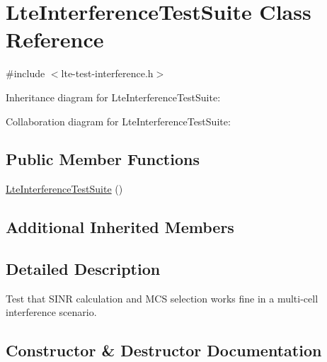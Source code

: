 \hypertarget{classLteInterferenceTestSuite}{}\section{Lte\+Interference\+Test\+Suite Class Reference}
\label{classLteInterferenceTestSuite}


{\ttfamily \#include $<$lte-\/test-\/interference.\+h$>$}



Inheritance diagram for Lte\+Interference\+Test\+Suite\+:


Collaboration diagram for Lte\+Interference\+Test\+Suite\+:
\subsection*{Public Member Functions}
\begin{DoxyCompactItemize}
\item 
\hyperlink{classLteInterferenceTestSuite_a65058ae26faab679cd648f382c68173b}{Lte\+Interference\+Test\+Suite} ()
\end{DoxyCompactItemize}
\subsection*{Additional Inherited Members}


\subsection{Detailed Description}
Test that S\+I\+NR calculation and M\+CS selection works fine in a multi-\/cell interference scenario. 

\subsection{Constructor \& Destructor Documentation}
